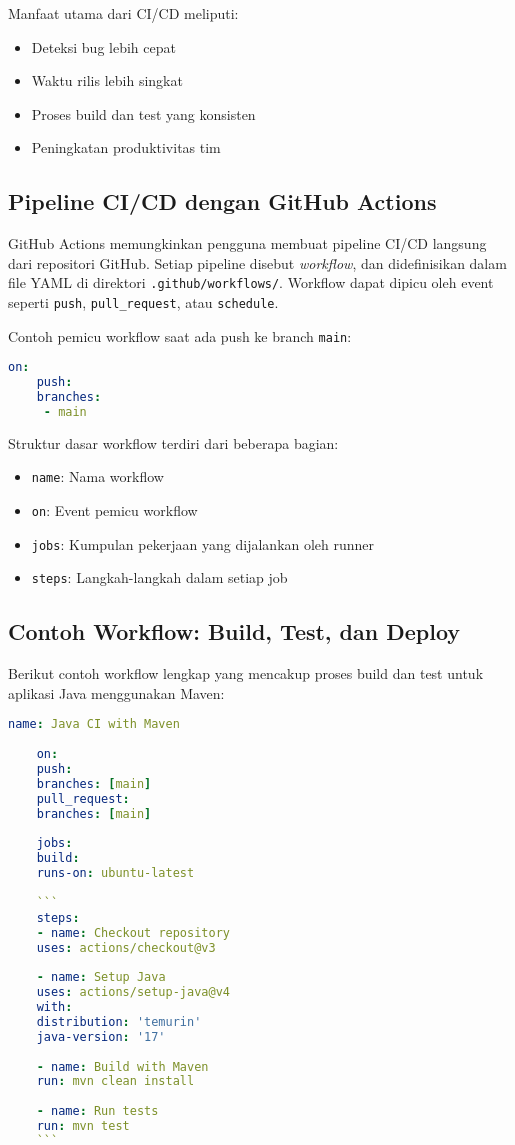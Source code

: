 Manfaat utama dari CI/CD meliputi:
\begin{itemize}
	\item Deteksi bug lebih cepat
	\item Waktu rilis lebih singkat
	\item Proses build dan test yang konsisten
	\item Peningkatan produktivitas tim
\end{itemize}

\subsection{Pipeline CI/CD dengan GitHub Actions}

GitHub Actions memungkinkan pengguna membuat pipeline CI/CD langsung dari repositori GitHub. Setiap pipeline disebut \textit{workflow}, dan didefinisikan dalam file YAML di direktori \texttt{.github/workflows/}. Workflow dapat dipicu oleh event seperti \texttt{push}, \texttt{pull\_request}, atau \texttt{schedule}.

Contoh pemicu workflow saat ada push ke branch \texttt{main}:

\begin{lstlisting}[language=yaml, caption={Trigger Workflow untuk Branch Main}]
	on:
	push:
	branches:
	 - main
\end{lstlisting}

Struktur dasar workflow terdiri dari beberapa bagian:
\begin{itemize}
	\item \texttt{name}: Nama workflow
	\item \texttt{on}: Event pemicu workflow
	\item \texttt{jobs}: Kumpulan pekerjaan yang dijalankan oleh runner
	\item \texttt{steps}: Langkah-langkah dalam setiap job
\end{itemize}

\subsection{Contoh Workflow: Build, Test, dan Deploy}

Berikut contoh workflow lengkap yang mencakup proses build dan test untuk aplikasi Java menggunakan Maven:

\begin{lstlisting}[language=yaml, caption={Contoh Workflow CI/CD Java dengan GitHub Actions}]
	name: Java CI with Maven
	
	on:
	push:
	branches: [main]
	pull_request:
	branches: [main]
	
	jobs:
	build:
	runs-on: ubuntu-latest
	
	```
	steps:
	- name: Checkout repository
	uses: actions/checkout@v3
	
	- name: Setup Java
	uses: actions/setup-java@v4
	with:
	distribution: 'temurin'
	java-version: '17'
	
	- name: Build with Maven
	run: mvn clean install
	
	- name: Run tests
	run: mvn test
	```
	
\end{lstlisting}

